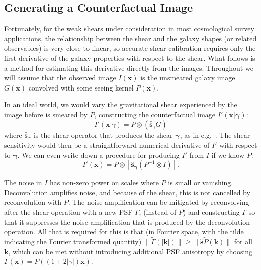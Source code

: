 \documentclass[iop]{emulateapj}
\begin{document}
\subsection{Generating a Counterfactual Image}
Fortunately, for the weak shears under consideration in most
cosmological survey applications, the relationship between the shear
and the galaxy shapes (or related observables) is very close to
linear, so accurate shear calibration requires only the first
derivative of the galaxy properties with respect to the shear. What
follows is a method for estimating this derivative directly from the
images. Throughout we will assume that the observed image
$I({\mathbf{x}})$ is the unsmeared galaxy image $G(\mathbf{x})$
convolved with some seeing kernel $P(\mathbf{x})$.

In an ideal world, we would vary the gravitational shear experienced
by the image before is smeared by $P$, constructing the counterfactual
image $I'(\mathbf{x}| {\boldsymbol \gamma})$:
\begin{equation}
  I'({\mathbf{x}}|\gamma) = P \otimes\left( \hat{\mathbf{s}}_{\gamma}G\right)
\end{equation}
where $\hat{\mathbf{s}}_{\boldsymbol \gamma}$ is the shear operator that produces the shear
${\boldsymbol \gamma}$, as in e.g.~\cite{2002AJ....123..583B}. The
shear sensitivity would then be a straightforward numerical derivative
of $I'$ with respect to ${\boldsymbol \gamma}$. We can even write down
a procedure for producing $I'$ from $I$ if we know $P$:
\begin{equation}
  I'({\mathbf{x}}) = P \otimes \left[\hat{\mathbf{s}}_{\boldsymbol \gamma}\left( P^{-1} \otimes I \right)\right].
\end{equation}

The noise in $I$ has non-zero power on scales where $P$ is small or
vanishing. Deconvolution amplifies noise, and because of the shear,
this is not cancelled by reconvolution with $P$.  
The noise amplification can be mitigated by reconvolving after the
shear operation with a new PSF $\Gamma$, (instead of $P$) and
constructing $\Gamma$ so that it suppresses the noise amplification
that is produced by the deconvolution operation. All that is required for
this is that (in Fourier space, with the tilde indicating the Fourier
transformed quantity)
$\|\tilde{\Gamma}(\mathbf{|k|}) \| \geq \|\hat{\mathbf{s}}
\tilde{P}(\mathbf{k})\|$
for all $\mathbf{k}$, which can be met without introducing additional
PSF anisotropy by choosing
$\Gamma(\mathbf{x}) = P\left((1+2|\gamma|)\mathbf{x}\right)$.
\end{document}

